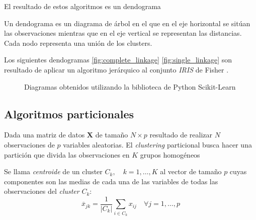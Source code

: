 \noindent El resultado de estos algoritmos es un dendograma \cite{Mardia 1979}
\begin{defi}
Un dendograma es un diagrama de árbol en el que en el eje horizontal se sitúan las observaciones mientras que en el eje vertical se representan las distancias. Cada nodo representa una unión de los clusters. 
\end{defi}

\noindent Los siguientes dendogramas \ref{fig:complete_linkage} \ref{fig:single_linkage}  son resultado de aplicar un algoritmo jerárquico al conjunto \emph{IRIS} de Fisher \cite{Iris Fisher}.
\begin{figure}[h]
 \centering
 \caption{Diagramas obtenidos utilizando la biblioteca de Python Scikit-Learn}
 \label{fig:Dendogramas distintos enlaces }
\end{figure}
\newpage
\subsection{Algoritmos particionales}

\noindent Dada una matriz de datos $\mathbf{X}$ de tamaño $N\times p$ resultado de realizar $N$ observaciones de $p$ variables aleatorias. El \emph{clustering} particional busca hacer una partición que divida las observaciones en $K$ grupos homogéneos 

\begin{defi}
Se llama \emph{centroide} de un cluster $C_k,\quad k=1,\ldots,K$ al vector de tamaño $p$ cuyas componentes son las medias de cada una de las variables de todas las observaciones del \emph{cluster} $C_k$:
\begin{equation}
\overline{x}_{jk}=\dfrac{1}{|C_k|}\sum_{i\in C_k}  x_{ij} \quad \forall j=1,\ldots, p
\end{equation}
\end{defi}

